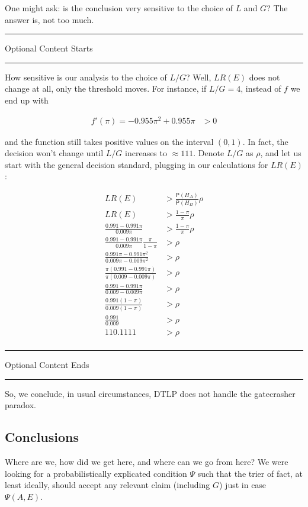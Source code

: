 \documentclass[10pt,dvipsnames,enabledeprecatedfontcommands]{scrartcl}
\newcommand{\pr}[1]{\mathsf{P}(#1)}
\newcommand{\intermezzoa}{
	\begin{minipage}[c]{13cm}
	\begin{center}\rule{10cm}{0.4pt}



	\tiny{\sc Optional Content Starts}
	
	\vspace{-1mm}
	
	\rule{10cm}{0.4pt}\end{center}
	\end{minipage}\nopagebreak 
	}
\newcommand{\intermezzob}{\nopagebreak 
	\begin{minipage}[c]{13cm}
	\begin{center}\rule{10cm}{0.4pt}

	\tiny{\sc Optional Content Ends}
	
	\vspace{-1mm}
	
	\rule{10cm}{0.4pt}\end{center}
	\end{minipage}
	}
\begin{document}
One might ask: is the conclusion very sensitive to the choice of \(L\)
and \(G\)? The answer is, not too much.

\intermezzoa

How sensitive is our analysis to the choice of \(L/G\)? Well, \(LR(E)\)
does not change at all, only the threshold moves. For instance, if
\(L/G=4\), instead of \(f\) we end up with

\begin{align*}
 f'(\pi) = - 0.955 \pi^2 + 0.955\pi &>0 
 \end{align*}

and the function still takes positive values on the interval \((0,1)\).
In fact, the decision won't change until \(L/G\) increases to
\(\approx 111\). Denote \(L/G\) as \(\rho\), and let us start with the
general decision standard, plugging in our calculations for \(LR(E)\):

\begin{align*}
LR(E) &> \frac{\pr{H_\Delta}}{\pr{H_\Pi}} \rho\\
LR(E) &> \frac{1-\pi}{\pi} \rho \\
\frac{0.991-0.991\pi}{0.009\pi} &> \frac{1-\pi}{\pi} \rho\\
\frac{0.991-0.991\pi}{0.009\pi}\frac{\pi}{1-\pi} &>  \rho\\
\frac{0.991\pi-0.991\pi^2}{0.009\pi-0.009\pi^2} &>  \rho\\
\frac{\pi(0.991-0.991\pi)}{\pi(0.009-0.009\pi)} &>  \rho\\
\frac{0.991-0.991\pi}{0.009-0.009\pi} &>  \rho\\
\frac{0.991(1-\pi)}{0.009(1-\pi)} &>  \rho\\
\frac{0.991}{0.009} &>  \rho\\
110.1111 &>  \rho\\
\end{align*}

\intermezzob

So, we conclude, in usual circumstances, DTLP does not handle the
gatecrasher paradox.

\subsection{Conclusions}\label{conclusions}

Where are we, how did we get here, and where can we go from here? We
were looking for a probabilistically explicated condition \(\Psi\) such
that the trier of fact, at least ideally, should accept any relevant
claim (including \(G\)) just in case \(\Psi(A,E)\).
\end{document}
